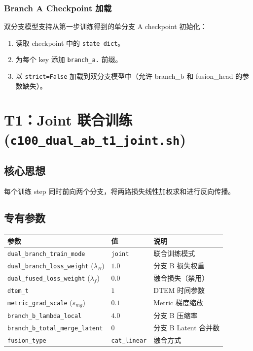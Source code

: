 \documentclass[a4paper,11pt]{article}
\begin{document}
\subsubsection{Branch A Checkpoint 加载}

双分支模型支持从第一步训练得到的单分支 A checkpoint 初始化：
\begin{enumerate}
    \item 读取 checkpoint 中的 \texttt{state\_dict}。
    \item 为每个 key 添加 \texttt{branch\_a.} 前缀。
    \item 以 \texttt{strict=False} 加载到双分支模型中（允许 branch\_b 和 fusion\_head 的参数缺失）。
\end{enumerate}

\section{T1：Joint 联合训练 (\texttt{c100\_dual\_ab\_t1\_joint.sh})}

\subsection{核心思想}

每个训练 step 同时前向两个分支，将两路损失线性加权求和进行反向传播。

\subsection{专有参数}

\begin{table}[h]
\centering
\begin{tabular}{l l l}
\toprule
\textbf{参数} & \textbf{值} & \textbf{说明} \\
\midrule
\texttt{dual\_branch\_train\_mode} & \texttt{joint} & 联合训练模式 \\
\texttt{dual\_branch\_loss\_weight} ($\lambda_B$) & $1.0$ & 分支 B 损失权重 \\
\texttt{dual\_fused\_loss\_weight} ($\lambda_f$) & $0.0$ & 融合损失（禁用） \\
\texttt{dtem\_t} & $1$ & DTEM 时间参数 \\
\texttt{metric\_grad\_scale} ($s_{mg}$) & $0.1$ & Metric 梯度缩放 \\
\texttt{branch\_b\_lambda\_local} & $4.0$ & 分支 B 压缩率 \\
\texttt{branch\_b\_total\_merge\_latent} & $0$ & 分支 B Latent 合并数 \\
\texttt{fusion\_type} & \texttt{cat\_linear} & 融合方式 \\
\bottomrule
\end{tabular}
\end{table}
\end{document}
